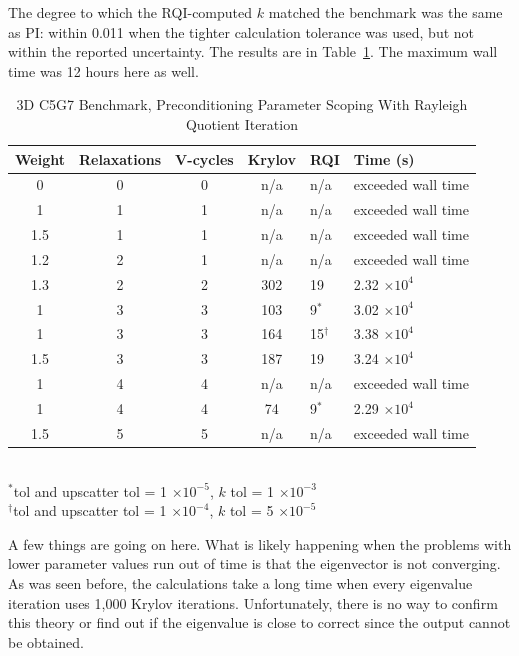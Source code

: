 The degree to which the RQI-computed $k$ matched the benchmark was the same as PI: within 0.011 when the tighter calculation tolerance was used, but not within the reported uncertainty. The results are in Table~\ref{table:3D c5g7 rqi}. The maximum wall time was 12 hours here as well. 
%
\begin{table}[!h]
\caption{3D C5G7 Benchmark, Preconditioning Parameter Scoping With Rayleigh Quotient Iteration}
\begin{center}
\begin{tabular}{c c c c l l}
\hline
Weight & Relaxations & V-cycles & Krylov & RQI & Time (s) \\[0.5ex]
\hline
0    & 0 & 0 & n/a     & n/a          & exceeded wall time \\
1    & 1 & 1 & n/a     & n/a          & exceeded wall time \\
1.5 & 1 & 1 & n/a     & n/a          & exceeded wall time \\
1.2 & 2 & 1 & n/a     & n/a          & exceeded wall time \\
1.3 & 2 & 2 & 302    & 19           & 2.32 $\times 10^{4}$ \\
1    & 3 & 3 & 103    & 9$^{*}$    & 3.02 $\times 10^{4}$ \\
1    & 3 & 3 & 164    & 15$^{\dagger}$ & 3.38 $\times 10^{4}$ \\
1.5 & 3 & 3 & 187    & 19           & 3.24 $\times 10^{4}$ \\
1    & 4 & 4 & n/a     & n/a          & exceeded wall time \\
1    & 4 & 4 & 74     & 9$^{*}$    & 2.29 $\times 10^{4}$ \\
1.5 & 5 & 5 & n/a     & n/a          & exceeded wall time \\
\hline 
\end{tabular}\\
$^{*}$tol and upscatter tol = 1 $\times 10^{-5}$, $k$ tol = 1 $\times 10^{-3}$\\
$^{\dagger}$tol and upscatter tol = 1 $\times 10^{-4}$, $k$ tol = 5 $\times 10^{-5}$
\end{center}
\label{table:3D c5g7 rqi}
\end{table}  

A few things are going on here. What is likely happening when the problems with lower parameter values run out of time is that the eigenvector is not converging. As was seen before, the calculations take a long time when every eigenvalue iteration uses 1,000 Krylov iterations. Unfortunately, there is no way to confirm this theory or find out if the eigenvalue is close to correct since the output cannot be obtained. 

